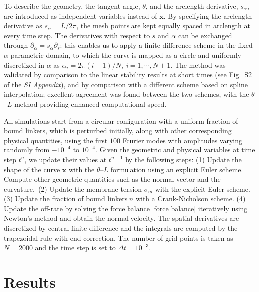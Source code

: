\documentclass[12pt]{article}
\newcommand{\mbf}{\boldsymbol}
\newcommand{\pl}{\partial}
\begin{document}
    To describe the geometry, the tangent angle, $\theta$, and the arclength derivative, $s_\alpha$, are introduced as independent variables instead of $\mbf{x}$. 
    By specifying the arclength derivative as $s_\alpha = L/2\pi$, the mesh points are kept equally spaced in arclength at every time step. 
    The derivatives with respect to $s$ and $\alpha$ can be exchanged through $\pl_\alpha = s_\alpha \pl_s$: this enables us to apply a finite difference scheme in the fixed $\alpha$-parametric domain, to which the curve is mapped as a circle and uniformly discretized in $\alpha$ as $\alpha_i = 2\pi(i-1)/N,\;i = 1,\cdots,N+1$. The method was validated by comparison to the linear stability results at short times (see Fig.~S2 of the \textit{SI Appendix}), and by comparison with a different scheme based on spline interpolation; excellent agreement was found between the two schemes, with the $\theta$--$L$ method providing enhanced computational speed.

    {All simulations start from a circular configuration with a uniform fraction of bound linkers, which is perturbed} initially, {along with} other corresponding physical quantities, using the first $100$ Fourier modes with amplitudes varying randomly from $-10^{-4}$ to $10^{-4}$. 
    Given the {geometric and physical variables} at time step $t^n$, we update their values at $t^{n+1}$ by the following steps:
    (1) Update the shape of the curve $\mbf{x}$ with the $\theta$--$L$ formulation using an explicit Euler scheme. Compute other geometric quantities such as the normal vector and the curvature.\ 
    (2) Update the membrane tension $\sigma_m$ with the explicit Euler scheme. 
    (3) Update the fraction of bound linkers $n$ with a Crank-Nicholson scheme. 
    (4) Update the off-rate by solving the force balance \eqref{force balance} iteratively using Newton's method and obtain the normal velocity. 
    The spatial derivatives are discretized by central finite difference and the integrals are computed by the trapezoidal rule with end-correction. 
    The number of grid points is taken as $N = 2000$ and the time step is set to $\Delta t = 10^{-3}$. 

    \section*{Results}
\end{document}
